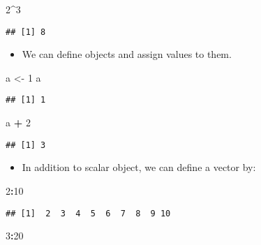 \documentclass[
]{book}
\newenvironment{Shaded}{\begin{snugshade}}{\end{snugshade}}
\newcommand{\DecValTok}[1]{\textcolor[rgb]{0.00,0.00,0.81}{#1}}
\newcommand{\NormalTok}[1]{#1}
\newcommand{\OperatorTok}[1]{\textcolor[rgb]{0.81,0.36,0.00}{\textbf{#1}}}
\newcommand{\StringTok}[1]{\textcolor[rgb]{0.31,0.60,0.02}{#1}}
\providecommand{\tightlist}{%
  \setlength{\itemsep}{0pt}\setlength{\parskip}{0pt}}
\begin{document}
\begin{Shaded}
\begin{Highlighting}[]
\DecValTok{2}\OperatorTok{^}\DecValTok{3}
\end{Highlighting}
\end{Shaded}

\begin{verbatim}
## [1] 8
\end{verbatim}

\begin{itemize}
\tightlist
\item
  We can define objects and assign values to them.
\end{itemize}

\begin{Shaded}
\begin{Highlighting}[]
\NormalTok{a <-}\StringTok{ }\DecValTok{1}
\NormalTok{a}
\end{Highlighting}
\end{Shaded}

\begin{verbatim}
## [1] 1
\end{verbatim}

\begin{Shaded}
\begin{Highlighting}[]
\NormalTok{a }\OperatorTok{+}\StringTok{ }\DecValTok{2}
\end{Highlighting}
\end{Shaded}

\begin{verbatim}
## [1] 3
\end{verbatim}

\begin{itemize}
\tightlist
\item
  In addition to scalar object, we can define a vector by:
\end{itemize}

\begin{Shaded}
\begin{Highlighting}[]
\DecValTok{2}\OperatorTok{:}\DecValTok{10}
\end{Highlighting}
\end{Shaded}

\begin{verbatim}
## [1]  2  3  4  5  6  7  8  9 10
\end{verbatim}

\begin{Shaded}
\begin{Highlighting}[]
\DecValTok{3}\OperatorTok{:}\DecValTok{20}
\end{Highlighting}
\end{Shaded}
\end{document}
